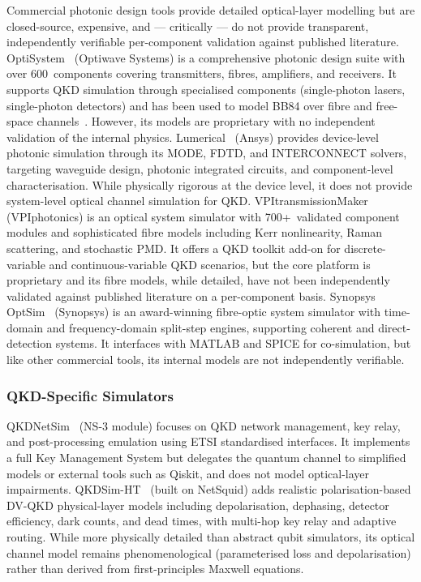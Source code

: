 \documentclass[3p,times,preprint]{elsarticle}
\begin{document}
Commercial photonic design tools provide detailed optical-layer modelling
but are closed-source, expensive, and --- critically --- do not provide
transparent, independently verifiable per-component validation against
published literature.  OptiSystem~\cite{optisystem}
(Optiwave Systems) is a comprehensive photonic design suite with over
600~components covering transmitters, fibres, amplifiers, and receivers.
It supports QKD simulation through specialised components (single-photon
lasers, single-photon detectors) and has been used to model BB84
over fibre and free-space channels~\cite{buhari2012}.  However, its
models are proprietary with no independent validation of the internal
physics.
Lumerical~\cite{lumerical} (Ansys) provides device-level photonic
simulation through its MODE, FDTD, and INTERCONNECT solvers, targeting
waveguide design, photonic integrated circuits, and component-level
characterisation.  While physically rigorous at the device level, it
does not provide system-level optical channel simulation for QKD.
VPItransmissionMaker~\cite{vpiphotonics} (VPIphotonics) is an optical
system simulator with 700+~validated component modules and sophisticated
fibre models including Kerr nonlinearity, Raman scattering, and
stochastic PMD.  It offers a QKD toolkit add-on for discrete-variable
and continuous-variable QKD scenarios, but the core platform is
proprietary and its fibre models, while detailed, have not been
independently validated against published literature on a per-component
basis.  Synopsys OptSim~\cite{optsim} (Synopsys) is an award-winning
fibre-optic system simulator with time-domain and frequency-domain
split-step engines, supporting coherent and direct-detection systems.
It interfaces with MATLAB and SPICE for co-simulation, but like other
commercial tools, its internal models are not independently verifiable.

\subsubsection{QKD-Specific Simulators}\label{sec:qkd-sim}

QKDNetSim~\cite{qkdnetsim} (NS-3 module) focuses on QKD network
management, key relay, and post-processing emulation using ETSI
standardised interfaces.  It implements a full Key Management System
but delegates the quantum channel to simplified models or external
tools such as Qiskit, and does not model optical-layer impairments.
QKDSim-HT~\cite{qkdsimht} (built on NetSquid) adds realistic
polarisation-based DV-QKD physical-layer models including
depolarisation, dephasing, detector efficiency, dark counts, and
dead times, with multi-hop key relay and adaptive routing.  While
more physically detailed than abstract qubit simulators, its optical
channel model remains phenomenological (parameterised loss and
depolarisation) rather than derived from first-principles Maxwell
equations.
\end{document}
